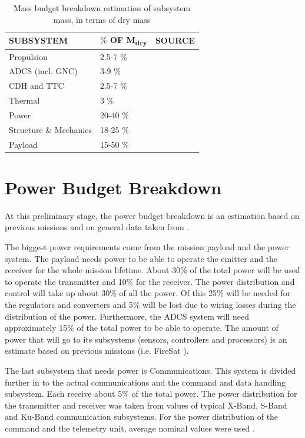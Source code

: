 \begin{table} [h]
\centering
\begin{tabular}{p{12cm} | l | l}
\textbf{SUBSYSTEM} & \textbf{$\%$ OF M\textsubscript{dry}} & \textbf{SOURCE} \\ \hline \hline
Propulsion & 2.5-7 \% & \cite{Space2b} \\ 
\ac{ADCS} (incl. \ac{GNC}) & 3-9 \% & \cite{Space2b} \\ 
\ac{CDH} and \ac{TTC} & 2.5-7 \% & \cite{Space2b} \\ 
Thermal & 3 \% & \cite{larson} \\ 
Power & 20-40 \% & \cite{Space2b} \\ 
Structure \& Mechanics & 18-25 \% & \cite{Space2b} \\ 
Payload & 15-50 \% & \cite{larson} 
\end{tabular} 
\caption{Mass budget breakdown estimation of subsystem mass, in terms of dry mass}
\label{rotsubsystemmass}
\end{table}


\section{Power Budget Breakdown}
\label{blBudgetPower}

At this preliminary stage, the power budget breakdown is an estimation based on previous missions and on general data taken from \cite{larson}.

The biggest power requirements come from the mission payload and the power system. The payload needs power to be able to operate the emitter
and the receiver for the whole mission lifetime. About 30$\%$ of the total power will be used to operate the transmitter and 10$\%$ for the receiver. The power distribution and control will take up about 30$\%$ of all the power. Of this 25$\%$ will be needed for the regulators and converters and 5$\%$ will be lost due to wiring losses during the distribution of the power. Furthermore, the \ac{ADCS} system will need approximately 15$\%$ of the total power to be able to operate. The amount of power that will go to its subsystems (sensors, controllers and processors) is an estimate based on previous missions (i.e. FireSat \cite{larson}).

The last subsystem that needs power is Communications. This system is divided further in to the actual communications and the command and data handling subsystem. Each receive about 5$\%$ of the total power. The power distribution for the transmitter and receiver was taken from values of typical X-Band, S-Band and Ku-Band communication subsystems.
For the power distribution of the command and the telemetry unit, average nominal values were used \cite{larson}.

